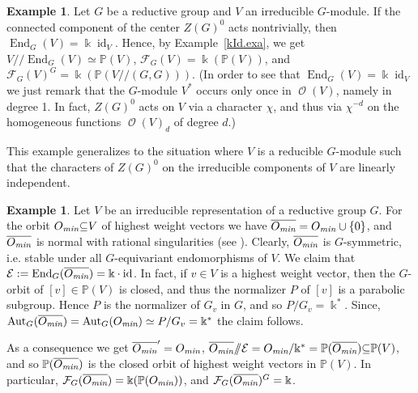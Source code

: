 \documentclass{amsart}
\theoremstyle{definition}
\newtheorem{exa}[thm]{Example}
\theoremstyle{remark}
\begin{document}
\begin{exa}
Let $G$ be a reductive group and $V$ an irreducible $G$-module. If the connected component of the center $Z(G)^{0}$ acts nontrivially, then $\operatorname{End}_{G}(V) ={\Bbbk} \operatorname{id}_{V}$. Hence, by Example~\ref{kId.exa}, we get $V{/\!\!/}\operatorname{End}_{G}(V) \simeq {\mathbb P}(V)$, ${\mathcal F}_{G}(V) = {\Bbbk}({\mathbb P}(V))$, and ${\mathcal F}_{G}(V)^{G} = {\Bbbk}({\mathbb P}(V{/\!\!/} (G,G)))$.
\newline
(In order to see that $\operatorname{End}_{G}(V) ={\Bbbk} \operatorname{id}_{V}$ we just remark that the $G$-module $V^{*}$ occurs only once in $\operatorname{\mathcal O}(V)$, namely in degree 1. In fact, $Z(G)^{0}$ acts on $V$ via a character $\chi$, and thus via $\chi^{-d}$ on the homogeneous functions $\operatorname{\mathcal O}(V)_{d}$ of degree $d$.)
\newline
\end{exa}
This example generalizes to the situation where $V$ is a reducible $G$-module such that the characters of $Z(G)^{0}$ on the irreducible components of $V$ are linearly independent. 

\begin{exa}\label{Omin.exa}
Let $V$ be an irreducible representation of a reductive group $G$. For the orbit ${O_{\text{\it min}}} {\subseteq} V$ of highest weight vectors we have
${\overline{O_{\text{\it min}}}} = {O_{\text{\it min}}} \cup \{0\}$, and ${\overline{O_{\text{\it min}}}}$ is normal with rational singularities (see \cite{He1979The-normality-of-c}). Clearly, ${\overline{O_{\text{\it min}}}}$ is $G$-symmetric, i.e. stable under all $G$-equivariant endomorphisms of $V$. We claim that ${\mathcal E}:=\operatorname{End}_{G}({\overline{O_{\text{\it min}}}}) = {\Bbbk}\cdot\operatorname{id}$. In fact, if $v \in V$ is a highest weight vector, then the $G$-orbit of $[v]\in{\mathbb P}(V)$ is closed, and thus the normalizer $P$ of $[v]$ is a parabolic subgroup. Hence $P$ is the normalizer of $G_{v}$ in $G$,  and so $P/G_{v}={\Bbbk^{*}}$. Since, $\operatorname{Aut}_{G}({\overline{O_{\text{\it min}}}})=\operatorname{Aut}_{G}({O_{\text{\it min}}})\simeq P/G_{v}={\Bbbk^{*}}$ the claim follows. 

As a consequence we get ${\overline{O_{\text{\it min}}}}'={O_{\text{\it min}}}$, ${\overline{O_{\text{\it min}}}}{/\!\!/} {\mathcal E} = {O_{\text{\it min}}}/{\Bbbk^{*}} = {\mathbb P}({\overline{O_{\text{\it min}}}}) {\subseteq} {\mathbb P}(V)$, and so ${\mathbb P}({\overline{O_{\text{\it min}}}})$ is the closed orbit of highest weight vectors in ${\mathbb P}(V)$. In particular, ${\mathcal F}_{G}({\overline{O_{\text{\it min}}}}) = {\Bbbk}({\mathbb P}({O_{\text{\it min}}}))$, and ${\mathcal F}_{G}({\overline{O_{\text{\it min}}}})^{G}={\Bbbk}$.
\end{exa}
\end{document}
